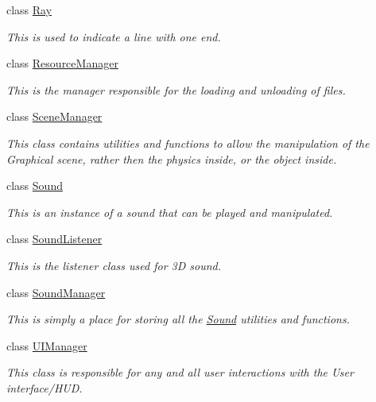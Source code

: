 \begin{DoxyCompactItemize}
class \hyperlink{classphys_1_1Ray}{Ray}
\begin{DoxyCompactList}\small\item\em This is used to indicate a line with one end. \item\end{DoxyCompactList}\item 
class \hyperlink{classphys_1_1ResourceManager}{ResourceManager}
\begin{DoxyCompactList}\small\item\em This is the manager responsible for the loading and unloading of files. \item\end{DoxyCompactList}\item 
class \hyperlink{classphys_1_1SceneManager}{SceneManager}
\begin{DoxyCompactList}\small\item\em This class contains utilities and functions to allow the manipulation of the Graphical scene, rather then the physics inside, or the object inside. \item\end{DoxyCompactList}\item 
class \hyperlink{classphys_1_1Sound}{Sound}
\begin{DoxyCompactList}\small\item\em This is an instance of a sound that can be played and manipulated. \item\end{DoxyCompactList}\item 
class \hyperlink{classphys_1_1SoundListener}{SoundListener}
\begin{DoxyCompactList}\small\item\em This is the listener class used for 3D sound. \item\end{DoxyCompactList}\item 
class \hyperlink{classphys_1_1SoundManager}{SoundManager}
\begin{DoxyCompactList}\small\item\em This is simply a place for storing all the \hyperlink{classphys_1_1Sound}{Sound} utilities and functions. \item\end{DoxyCompactList}\item 
class \hyperlink{classphys_1_1UIManager}{UIManager}
\begin{DoxyCompactList}\small\item\em This class is responsible for any and all user interactions with the User interface/HUD. \item\end{DoxyCompactList}\item 

\end{DoxyCompactItemize}
